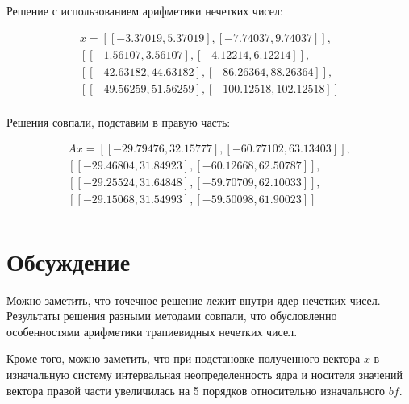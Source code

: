 \documentclass[a4paper,12pt]{article}
\begin{document}
    \quad Решение с использованием арифметики нечетких чисел:

   \begin{equation}
        \begin{gathered}
            x = [[-3.37019, 5.37019], [-7.74037, 9.74037]], \\
            [[-1.56107, 3.56107], [-4.12214, 6.12214]],  \\
            [[-42.63182, 44.63182], [-86.26364, 88.26364]], \\
            [[-49.56259, 51.56259], [-100.12518, 102.12518]] \\
        \end{gathered}
    \end{equation}

    \quad Решения совпали, подставим в правую часть:

    \begin{equation}
        \begin{gathered}
            Ax = [[-29.79476, 32.15777], [-60.77102, 63.13403]], \\
            [[-29.46804, 31.84923], [-60.12668, 62.50787]],  \\
            [[-29.25524, 31.64848], [-59.70709, 62.10033]], \\
            [[-29.15068, 31.54993], [-59.50098, 61.90023]] \\
        \end{gathered}
    \end{equation}
    
    \section{Обсуждение}
    \quad Можно заметить, что точечное решение лежит внутри ядер нечетких чисел.
    Результаты решения разными методами совпали, что обусловленно особенностями арифметики трапиевидных нечетких чисел. 
    
    Кроме того, можно заметить, что при подстановке полученного вектора $ x $ в изначальную систему интервальная неопределенность ядра и носителя значений вектора правой части увеличилась на 5 порядков относительно изначального $ bf $.
\end{document}

